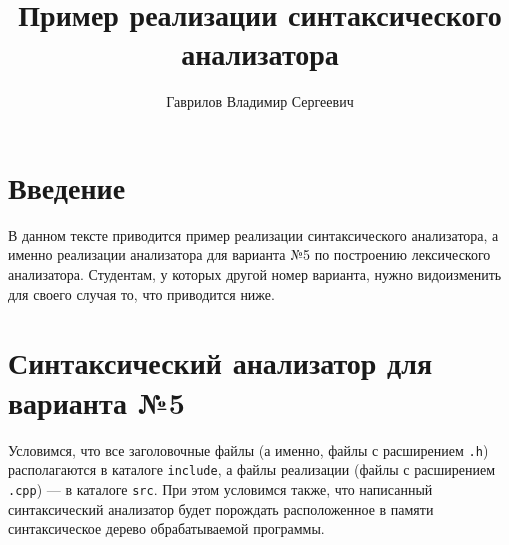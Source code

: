 \documentclass[10pt]{article}
\begin{document}
\unitlength=5mm

\author{Гаврилов Владимир Сергеевич}
\title{Пример реализации синтаксического анализатора}
\maketitle

    \tableofcontents


\section{Введение}
В данном тексте приводится пример реализации синтаксического анализатора, а именно реализации анализатора для варианта №5 по построению лексического анализатора. Студентам, у которых другой номер варианта, нужно видоизменить для своего случая то, что приводится ниже.

\section{Синтаксический анализатор для варианта №5}

Условимся, что все заголовочные файлы (а именно, файлы с расширением \texttt{.h}) располагаются в каталоге \texttt{include}, а файлы реализации (файлы с расширением \texttt{.cpp}) --- в каталоге \texttt{src}.
При этом условимся также, что написанный синтаксический анализатор будет порождать расположенное в памяти синтаксическое дерево обрабатываемой программы.
\end{document}
